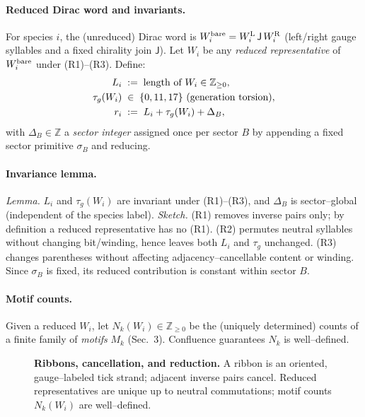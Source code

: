 \documentclass[epjc3]{svjour3}
\begin{document}
\paragraph{Reduced Dirac word and invariants.}
For species $i$, the (unreduced) Dirac word is $W_i^{\rm bare}=W_i^{\rm L}\,\mathsf{J}\,W_i^{\rm R}$ (left/right gauge syllables and a fixed chirality join $\mathsf{J}$).  
Let $W_i$ be any \emph{reduced representative} of $W_i^{\rm bare}$ under (R1)–(R3).
Define:
\begin{align}
  L_i &\;:=\; \text{length of }W_i \in \mathbb{Z}_{\ge 0}, \notag\\
  \tau_g(W_i) &\;\in\; \{0,11,17\}\ \text{(generation torsion)}, \notag\\
  r_i &\;:=\; L_i+\tau_g(W_i)+\Delta_B, \notag
\end{align}
with $\Delta_B\in\mathbb{Z}$ a \emph{sector integer} assigned once per sector $B$ by appending a fixed sector primitive $\sigma_B$ and reducing.  

\paragraph{Invariance lemma.}
\emph{Lemma.} $L_i$ and $\tau_g(W_i)$ are invariant under (R1)–(R3), and $\Delta_B$ is sector–global (independent of the species label).  
\emph{Sketch.} (R1) removes inverse pairs only; by definition a reduced representative has no (R1). (R2) permutes neutral syllables without changing bit/winding, hence leaves both $L_i$ and $\tau_g$ unchanged. (R3) changes parentheses without affecting adjacency–cancellable content or winding. Since $\sigma_B$ is fixed, its reduced contribution is constant within sector $B$.

\paragraph{Motif counts.}
Given a reduced $W_i$, let $N_k(W_i)\in\mathbb{Z}_{\ge 0}$ be the (uniquely determined) counts of a finite family of \emph{motifs} $M_k$ (Sec.~3).  Confluence guarantees $N_k$ is well–defined.

\begin{figure}[t]
  \centering
  \caption{\textbf{Ribbons, cancellation, and reduction.} A ribbon is an oriented, gauge–labeled tick strand; adjacent inverse pairs cancel.  Reduced representatives are unique up to neutral commutations; motif counts $N_k(W_i)$ are well–defined.}
\end{figure}
\end{document}

